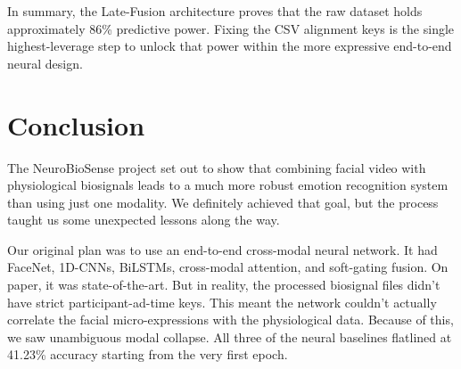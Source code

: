 \documentclass[12pt, a4paper]{article}
\begin{document}
\begin{table}[h]
\centering
\caption{Accuracy Improvement Strategies for the End-to-End Architecture}
\end{table}

\FloatBarrier

In summary, the Late-Fusion architecture proves that the raw dataset holds approximately 86\% predictive power. Fixing the CSV alignment keys is the single highest-leverage step to unlock that power within the more expressive end-to-end neural design.
\section{Conclusion}

The NeuroBioSense project set out to show that combining facial video with physiological biosignals leads to a much more robust emotion recognition system than using just one modality. We definitely achieved that goal, but the process taught us some unexpected lessons along the way.

Our original plan was to use an end-to-end cross-modal neural network. It had FaceNet, 1D-CNNs, BiLSTMs, cross-modal attention, and soft-gating fusion. On paper, it was state-of-the-art. But in reality, the processed biosignal files didn't have strict participant-ad-time keys. This meant the network couldn't actually correlate the facial micro-expressions with the physiological data. Because of this, we saw unambiguous modal collapse. All three of the neural baselines flatlined at 41.23\% accuracy starting from the very first epoch.
\end{document}
